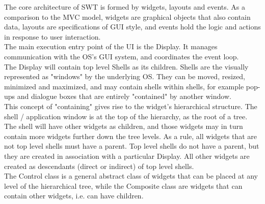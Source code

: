 The core architecture of SWT is formed by widgets, layouts and events. As a comparison to the MVC model, widgets are graphical objects that also contain data, layouts are specifications of GUI style, and events hold the logic and actions in response to user interaction.\\
The main execution entry point of the UI is the Display. It manages communication with the OS's GUI system, and coordinates the event loop. \cite{swtwidget}\\
The Display will contain top level Shells as its children. Shells are the visually represented as "windows" by the underlying OS. They can be moved, resized, minimized and maximized, and may contain shells within shells, for example pop-ups and dialogue boxes that are entirely "contained" by another window.\\
This concept of "containing" gives rise to the widget's hierarchical structure. The shell / application window is at the top of the hierarchy, as the root of a tree. The shell will have other widgets as children, and those widgets may in turn contain more widgets further down the tree levels. As a rule, all widgets that are not top level shells must have a parent. Top level shells do not have a parent, but they are created in association with a particular Display. All other widgets are created as descendants (direct or indirect) of top level shells.\\
The Control class is a general abstract class of widgets that can be placed at any level of the hierarchical tree, while the Composite class are widgets that can contain other widgets, i.e. can have children. \cite{swtcontrol}\\
